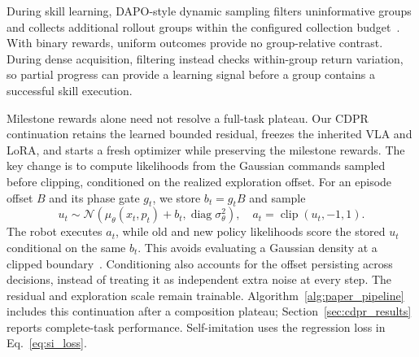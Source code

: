 During skill learning, DAPO-style dynamic sampling filters uninformative groups and collects additional rollout groups within the configured collection budget~\cite{dapo}. With binary rewards, uniform outcomes provide no group-relative contrast. During dense acquisition, filtering instead checks within-group return variation, so partial progress can provide a learning signal before a group contains a successful skill execution.

Milestone rewards alone need not resolve a full-task plateau. Our CDPR continuation retains the learned bounded residual, freezes the inherited VLA and LoRA, and starts a fresh optimizer while preserving the milestone rewards. The key change is to compute likelihoods from the Gaussian commands sampled before clipping, conditioned on the realized exploration offset. For an episode offset $B$ and its phase gate $g_t$, we store $b_t=g_tB$ and sample
\begin{equation}
u_t\sim\mathcal N(\mu_\theta(x_t,p_t)+b_t,\operatorname{diag}\sigma_\theta^2),
\quad a_t=\operatorname{clip}(u_t,-1,1).
\label{eq:latent_action}
\end{equation}
The robot executes $a_t$, while old and new policy likelihoods score the stored $u_t$ conditional on the same $b_t$. This avoids evaluating a Gaussian density at a clipped boundary~\cite{capg}. Conditioning also accounts for the offset persisting across decisions, instead of treating it as independent extra noise at every step. The residual and exploration scale remain trainable. Algorithm~\ref{alg:paper_pipeline} includes this continuation after a composition plateau; Section~\ref{sec:cdpr_results} reports complete-task performance. Self-imitation uses the regression loss in Eq.~\eqref{eq:si_loss}.




